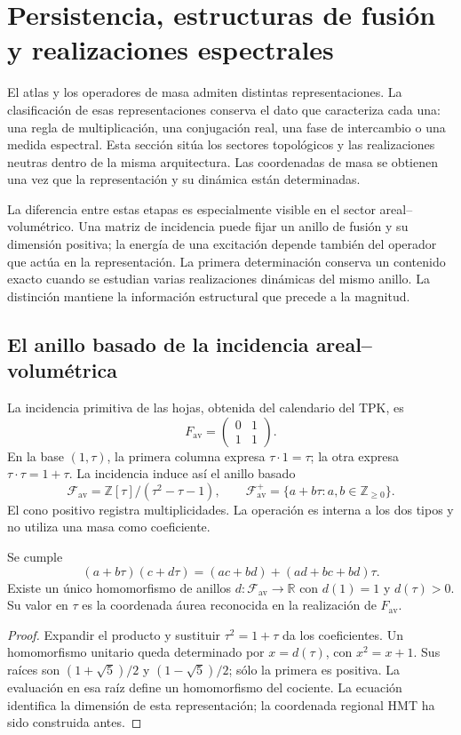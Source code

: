\section{Persistencia, estructuras de fusión y realizaciones espectrales}
\label{vi:sec:topologia}

El atlas y los operadores de masa admiten distintas representaciones. La
clasificación de esas representaciones conserva el dato que caracteriza
cada una: una regla de multiplicación, una conjugación real, una fase de
intercambio o una medida espectral. Esta sección sitúa los sectores
topológicos y las realizaciones neutras dentro de la misma arquitectura.
Las coordenadas de masa se obtienen una vez que la representación y su
dinámica están determinadas.

La diferencia entre estas etapas es especialmente visible en el sector
areal--volumétrico. Una matriz de incidencia puede fijar un anillo de fusión
y su dimensión positiva; la energía de una excitación depende también del
operador que actúa en la representación. La primera determinación conserva
un contenido exacto cuando se estudian varias realizaciones dinámicas
del mismo anillo. La distinción mantiene la información estructural que
precede a la magnitud.

\subsection{El anillo basado de la incidencia areal--volumétrica}
\label{vi:subsec:fusion-av}

La incidencia primitiva de las hojas, obtenida del calendario del TPK, es
\[
 F_{\mathrm{av}}=\begin{pmatrix}0&1\\1&1\end{pmatrix}.
\]
En la base $(1,\tau)$, la primera columna expresa
$\tau\cdot1=\tau$; la otra expresa $\tau\cdot\tau=1+\tau$.
La incidencia induce así el anillo basado
\[
 \mathcal F_{\mathrm{av}}=\mathbb Z[\tau]/(\tau^2-\tau-1),
 \qquad \mathcal F_{\mathrm{av}}^+
 =\{a+b\tau:a,b\in\mathbb Z_{\geq0}\}.
\]
El cono positivo registra multiplicidades. La operación es interna a los
dos tipos y no utiliza una masa como coeficiente.

\begin{proposition}
\label{vi:prop:fusion-av}
Se cumple
\[
 (a+b\tau)(c+d\tau)
 =(ac+bd)+(ad+bc+bd)\tau.
\]
Existe un único homomorfismo de anillos $d:\mathcal F_{\mathrm{av}}
\to\mathbb R$ con $d(1)=1$ y $d(\tau)>0$. Su valor en $\tau$
es la coordenada áurea reconocida en la realización de $F_{\mathrm{av}}$.
\end{proposition}
\begin{proof}
Expandir el producto y sustituir $\tau^2=1+\tau$ da los coeficientes.
Un homomorfismo unitario queda determinado por $x=d(\tau)$, con
$x^2=x+1$. Sus raíces son $(1+\sqrt5)/2$ y $(1-\sqrt5)/2$;
sólo la primera es positiva. La evaluación en esa raíz define un
homomorfismo del cociente. La ecuación identifica la dimensión de esta
representación; la coordenada regional HMT ha sido construida antes.
\end{proof}

